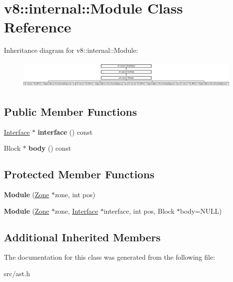 \hypertarget{classv8_1_1internal_1_1_module}{}\section{v8\+:\+:internal\+:\+:Module Class Reference}
\label{classv8_1_1internal_1_1_module}
Inheritance diagram for v8\+:\+:internal\+:\+:Module\+:\begin{figure}[H]
\begin{center}
\leavevmode
\includegraphics[height=1.428571cm]{classv8_1_1internal_1_1_module}
\end{center}
\end{figure}
\subsection*{Public Member Functions}
\begin{DoxyCompactItemize}
\item 
\hypertarget{classv8_1_1internal_1_1_module_a44ce42eb49a0ed48c1f97420fdfb13a2}{}\hyperlink{classv8_1_1internal_1_1_interface}{Interface} $\ast$ {\bfseries interface} () const \label{classv8_1_1internal_1_1_module_a44ce42eb49a0ed48c1f97420fdfb13a2}

\item 
\hypertarget{classv8_1_1internal_1_1_module_a4e18d4a3e438da920c667e37e698698c}{}Block $\ast$ {\bfseries body} () const \label{classv8_1_1internal_1_1_module_a4e18d4a3e438da920c667e37e698698c}

\end{DoxyCompactItemize}
\subsection*{Protected Member Functions}
\begin{DoxyCompactItemize}
\item 
\hypertarget{classv8_1_1internal_1_1_module_a6e3c0c186b1d8b877ff9bc59ecdb6bc0}{}{\bfseries Module} (\hyperlink{classv8_1_1internal_1_1_zone}{Zone} $\ast$zone, int pos)\label{classv8_1_1internal_1_1_module_a6e3c0c186b1d8b877ff9bc59ecdb6bc0}

\item 
\hypertarget{classv8_1_1internal_1_1_module_af12b2a7fa5589f8ede98dc50494c1f2d}{}{\bfseries Module} (\hyperlink{classv8_1_1internal_1_1_zone}{Zone} $\ast$zone, \hyperlink{classv8_1_1internal_1_1_interface}{Interface} $\ast$interface, int pos, Block $\ast$body=N\+U\+L\+L)\label{classv8_1_1internal_1_1_module_af12b2a7fa5589f8ede98dc50494c1f2d}

\end{DoxyCompactItemize}
\subsection*{Additional Inherited Members}


The documentation for this class was generated from the following file\+:\begin{DoxyCompactItemize}
\item 
src/ast.\+h\end{DoxyCompactItemize}
